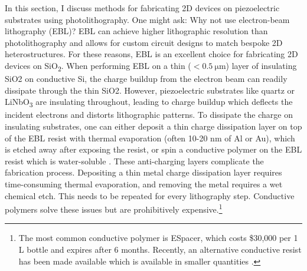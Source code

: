 \documentclass[double,12pt,1in,seploa]{beavtex}
\begin{document}
In this section, I discuss methods for fabricating 2D devices on piezoelectric substrates using photolithography. One might ask: Why not use electron-beam lithography (EBL)? EBL can achieve higher lithographic resolution than photolithography and allows for custom circuit designs to match bespoke 2D heterostructures. For these reasons, EBL is an excellent choice for fabricating 2D devices on SiO\textsubscript{2}. When performing EBL on a thin ($< \SI{0.5}{\micro\meter}$) layer of insulating SiO2 on conductive Si, the charge buildup from the electron beam can readily dissipate through the thin SiO2. However, piezoelectric substrates like quartz or LiNbO\textsubscript{3} are insulating throughout, leading to charge buildup which deflects the incident electrons and distorts lithographic patterns. To dissipate the charge on insulating substrates, one can either deposit a thin charge dissipation layer on top of the EBL resist with thermal evaporation (often 10-20 nm of Al or Au), which is etched away after exposing the resist, or spin a conductive polymer on the EBL resist which is water-soluble \cite{noauthor_nanolithography_nodate}. These anti-charging layers complicate the fabrication process. Depositing a thin metal charge dissipation layer requires time-consuming thermal evaporation, and removing the metal requires a wet chemical etch. This needs to be repeated for every lithography step. Conductive polymers solve these issues but are prohibitively expensive.\footnote{The most common conductive polymer is ESpacer, which costs \$30,000 per 1 L bottle and expires after 6 months. Recently, an alternative conductive resist has been made available which is available in smaller quantities \cite{lopez_charge_2019}.}  
\end{document}
